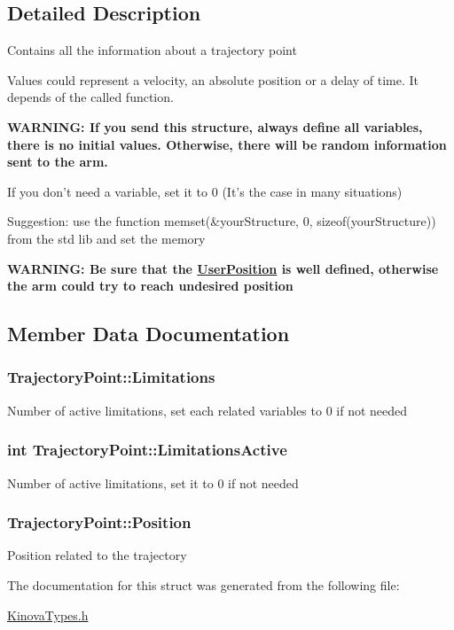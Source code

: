 \subsection{Detailed Description}
\par
Contains all the information about a trajectory point \par
Values could represent a velocity, an absolute position or a delay of time. It depends of the called function. \par
{\bfseries W\-A\-R\-N\-I\-N\-G\-: If you send this structure, always define all variables, there is no initial values. Otherwise, there will be random information sent to the arm.} \par
If you don't need a variable, set it to 0 (It's the case in many situations) \par
Suggestion\-: use the function memset(\&your\-Structure, 0, sizeof(your\-Structure)) from the std lib and set the memory \par
{\bfseries W\-A\-R\-N\-I\-N\-G\-: Be sure that the \hyperlink{struct_user_position}{User\-Position} is well defined, otherwise the arm could try to reach undesired position} 



\subsection{Member Data Documentation}
\hypertarget{struct_trajectory_point_ad6d7f13b1dee1ef3a5300ffffd77cac8}{
\subsubsection[{Limitations}]{ Trajectory\-Point\-::\-Limitations}}\label{struct_trajectory_point_ad6d7f13b1dee1ef3a5300ffffd77cac8}
Number of active limitations, set each related variables to 0 if not needed \hypertarget{struct_trajectory_point_acec47b76503d6f202e78bd00ec8fa02d}{
\subsubsection[{Limitations\-Active}]{\setlength{\rightskip}{0pt plus 5cm}int Trajectory\-Point\-::\-Limitations\-Active}}\label{struct_trajectory_point_acec47b76503d6f202e78bd00ec8fa02d}
Number of active limitations, set it to 0 if not needed \hypertarget{struct_trajectory_point_aa24430dc273e9d7968a6c44e3bcee259}{
\subsubsection[{Position}]{ Trajectory\-Point\-::\-Position}}\label{struct_trajectory_point_aa24430dc273e9d7968a6c44e3bcee259}
Position related to the trajectory 

The documentation for this struct was generated from the following file\-:\begin{DoxyCompactItemize}
\item 
\hyperlink{_kinova_types_8h}{Kinova\-Types.\-h}\end{DoxyCompactItemize}
